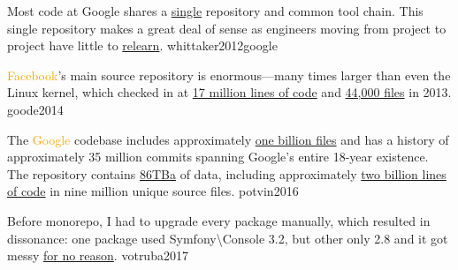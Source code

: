 \documentclass{article}
\begin{document}

  {Most code at Google shares a \ul{single} repository and common tool chain. This single repository makes a great deal of sense as engineers moving from project to project have little to \ul{relearn}.}
  {whittaker2012google}

  {\textcolor{orange}{Facebook}'s main source repository is enormous---many times larger than even the Linux kernel, which checked in at \ul{17 million lines of code} and \ul{44,000 files} in 2013.}
  {goode2014}

  {The \textcolor{orange}{Google} codebase includes approximately \ul{one billion files} and has a history of approximately 35 million commits spanning Google's entire 18-year existence. The repository contains \ul{86TBa} of data, including approximately \ul{two billion lines of code} in nine million unique source files.}
  {potvin2016}

  {Before monorepo, I had to upgrade every package manually, which resulted in dissonance: one package used Symfony\textbackslash{}Console 3.2, but other only 2.8 and it got messy \ul{for no reason}.}
  {votruba2017}

\end{document}
